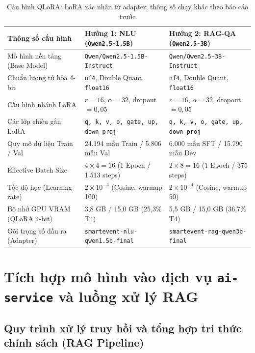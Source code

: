 \begin{table}[!htbp]
\centering
\caption{Cấu hình QLoRA: LoRA xác nhận từ adapter; thông số chạy khác theo báo cáo trước}
\label{tab:hyperparameters_comparison}
\small
\renewcommand{\arraystretch}{1.12}
\begin{tabularx}{\textwidth}{|L{4.2cm}|C{5.2cm}|X|}
\hline
{}
\textbf{Thông số cấu hình} & \textbf{Hướng 1: NLU (\texttt{Qwen2.5-1.5B})} & \textbf{Hướng 2: RAG-QA (\texttt{Qwen2.5-3B})} \\
\hline
Mô hình nền tảng (Base Model) & \texttt{Qwen/\allowbreak Qwen2.5-1.5B-Instruct} & \texttt{Qwen/\allowbreak Qwen2.5-3B-Instruct} \\
\hline
Chuẩn lượng tử hóa 4-bit & \texttt{nf4}, Double Quant, \texttt{float16} & \texttt{nf4}, Double Quant, \texttt{float16} \\
\hline
Cấu hình nhánh LoRA & $r = 16$, $\alpha = 32$, dropout $= 0{,}05$ & $r = 16$, $\alpha = 32$, dropout $= 0{,}05$ \\
\hline
Các lớp chiếu gắn LoRA & \texttt{q, k, v, o, gate, up, down\_\allowbreak proj} & \texttt{q, k, v, o, gate, up, down\_\allowbreak proj} \\
\hline
Quy mô dữ liệu Train / Val & 24.194 mẫu Train / 5.806 mẫu Val & 6.000 mẫu SFT / 15.790 mẫu Dev \\
\hline
Effective Batch Size & $4 \times 4 = 16$ (1 Epoch / 1.513 steps) & $2 \times 8 = 16$ (1 Epoch / 375 steps) \\
\hline
Tốc độ học (Learning rate) & $2 \times 10^{-4}$ (Cosine, warmup 100) & $2 \times 10^{-4}$ (Cosine, warmup 50) \\
\hline
Bộ nhớ GPU VRAM (QLoRA 4-bit) & 3,8 GB / 15,0 GB (25,3\% T4) & 5,5 GB / 15,0 GB (36,7\% T4) \\
\hline
Gói trọng số đầu ra (Adapter) & \texttt{smartevent-nlu-\allowbreak qwen1.5b-final} & \texttt{smartevent-rag-\allowbreak qwen3b-final} \\
\hline
\end{tabularx}
\end{table}

\section{Tích hợp mô hình vào dịch vụ \texttt{ai-service} và luồng xử lý RAG}
\label{sec:model_integration_aiservice}

\subsection{Quy trình xử lý truy hồi và tổng hợp tri thức chính sách (RAG Pipeline)}

